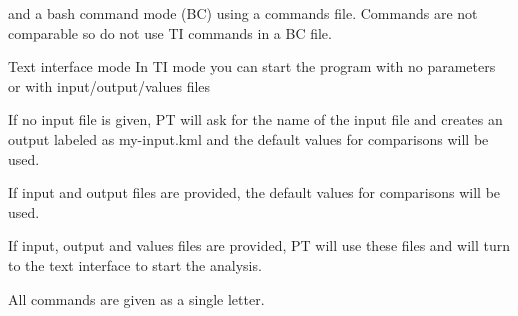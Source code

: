 

 and a bash command mode (BC) using a commands file. Commands are not comparable so do not use TI commands in a BC file.
	
	Text interface mode
	In TI mode you can start the program with no parameters or with 
	input/output/values files
	
	If no input file is given, PT will ask for the name of the input file
	and creates an output labeled as my-input.kml and the default values for 
	comparisons will be used.  

	If input and output files are provided, the default values for 
	comparisons will be used.  
	
	If input, output and values files are provided, PT will use these
	files and will turn to the text interface to start the analysis.
	
	All commands are given as a single letter.
